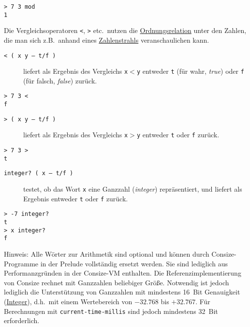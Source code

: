 \begin{verbatim}
> 7 3 mod
1
\end{verbatim}

Die Vergleichsoperatoren \verb|<|, \verb|>| etc.\ nutzen die \href{http://de.wikipedia.org/wiki/Ordnungsrelation}{Ordnungsrelation} unter den Zahlen, die man sich z.B.\ anhand eines \href{http://de.wikipedia.org/wiki/Zahlengerade}{Zahlenstrahls} veranschaulichen kann.

\begin{description}
\item[\texttt{< ( x y -- t/f )}] liefert als Ergebnis des Vergleichs \verb|x|$<$\verb|y| entweder \verb|t| (für wahr, \emph{true}) oder \verb|f| (für falsch, \emph{false}) zurück.
\end{description}

\begin{verbatim}
> 7 3 <
f
\end{verbatim}

\begin{description}
\item[\texttt{> ( x y -- t/f )}] liefert als Ergebnis des Vergleichs \verb|x|$>$\verb|y| entweder \verb|t| oder \verb|f| zurück.
\end{description}

\begin{verbatim}
> 7 3 >
t
\end{verbatim}

\begin{description}
\item[\texttt{integer? ( x -- t/f )}] testet, ob das Wort \verb|x| eine Ganzzahl (\emph{integer}) repräsentiert, und liefert als Ergebnis entweder \verb|t| oder \verb|f| zurück.
\end{description}

\begin{verbatim}
> -7 integer?
t
> x integer?
f
\end{verbatim}

Hinweis: Alle Wörter zur Arithmetik sind optional und können durch Consize-Programme in der Prelude vollständig ersetzt werden. Sie sind lediglich aus Performanzgründen in der Consize-VM enthalten. Die Referenzimplementierung von Consize rechnet mit Ganzzahlen beliebiger Größe. Notwendig ist jedoch lediglich die Unterstützung von Ganzzahlen mit mindestens 16~Bit Genauigkeit (\href{http://de.wikipedia.org/wiki/Integer\_(Datentyp)}{Integer}), d.h.\ mit einem Wertebereich von $-32.768$ bis $+32.767$. Für Berechnungen mit \verb|current-time-millis| sind jedoch mindestens 32~Bit erforderlich.


